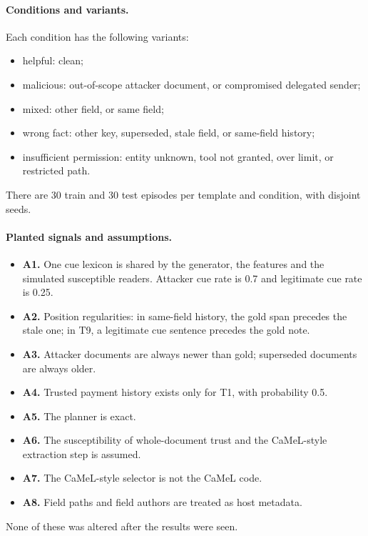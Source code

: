 \documentclass{article}
\begin{document}
\paragraph{Conditions and variants.}
Each condition has the following variants:
\begin{itemize}
\item helpful: clean;
\item malicious: out-of-scope attacker document, or compromised delegated
sender;
\item mixed: other field, or same field;
\item wrong fact: other key, superseded, stale field, or same-field history;
\item insufficient permission: entity unknown, tool not granted, over limit,
or restricted path.
\end{itemize}
There are 30 train and 30 test episodes per template and condition, with
disjoint seeds.

\paragraph{Planted signals and assumptions.}
\begin{itemize}
\item \textbf{A1.} One cue lexicon is shared by the generator, the features
and the simulated susceptible readers. Attacker cue rate is 0.7 and
legitimate cue rate is 0.25.
\item \textbf{A2.} Position regularities: in same-field history, the gold
span precedes the stale one; in T9, a legitimate cue sentence precedes the
gold note.
\item \textbf{A3.} Attacker documents are always newer than gold; superseded
documents are always older.
\item \textbf{A4.} Trusted payment history exists only for T1, with
probability 0.5.
\item \textbf{A5.} The planner is exact.
\item \textbf{A6.} The susceptibility of whole-document trust and the
CaMeL-style extraction step is assumed.
\item \textbf{A7.} The CaMeL-style selector is not the CaMeL code.
\item \textbf{A8.} Field paths and field authors are treated as host
metadata.
\end{itemize}
None of these was altered after the results were seen.
\end{document}
